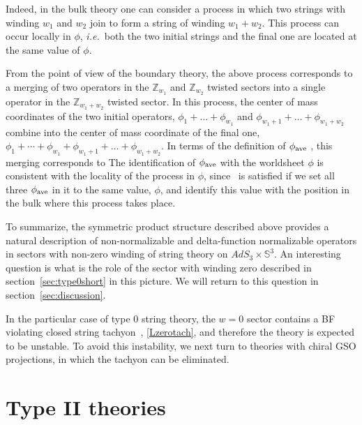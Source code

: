 \documentclass[12pt]{article}
\def\ie{{i.e.}}
\newcommand{\bS}{{\mathbb S}}
\newcommand{\bZ}{{\mathbb Z}}
\numberwithin{equation}{section}
\def\ie{{\it i.e.}}
\def\ie{{\it i.e.}}
\begin{document}
Indeed, in the bulk theory one can consider a process in which two strings with winding $w_1$ and $w_2$ join to form a string of winding $w_1+w_2$. This process can occur locally in $\phi$, \ie\ both the two initial strings and the final one are located at the same value of $\phi$. 

From the point of view of the boundary theory, the above process corresponds to a merging of two operators in the $\bZ_{w_1}$ and $\bZ_{w_2}$ twisted sectors into a single operator in the $\bZ_{w_1+w_2}$ twisted sector. In this process, the center of mass coordinates of the two initial operators, $\phi_1+\dots+\phi_{w_1}$ and $\phi_{w_1+1}+\dots+\phi_{w_1+w_2}$ combine into the center of mass coordinate of the final one, $\phi_1+\cdots+\phi_{w_1}+\phi_{w_1+1}+\dots+\phi_{w_1+w_2}$. In terms of the definition of $\phi_{\rm ave}$ \phiave, this merging corresponds to 
The identification of $\phi_{\rm ave}$ with the worldsheet $\phi$ is consistent with the locality of the process in $\phi$, since \bulklocal\ is satisfied if we set all three $\phi_{\rm ave}$ in it to the same value, $\phi$, and identify this value with the position in the bulk where this process takes place. 

To summarize, the symmetric product structure described above provides a natural description of non-normalizable and delta-function normalizable operators in sectors with non-zero winding of string theory on $AdS_3\times \bS^3$. An interesting question is what is the role of the sector with winding zero described in section~\ref{sec:type0short} in this picture. We will return to this question in section~\ref{sec:discussion}.

In the particular case of type 0 string theory, the $w=0$ sector contains a BF violating closed string tachyon~\VNS, \eqref{Lzerotach}, and therefore the theory is expected to be unstable.  To avoid this instability, we next turn to theories with chiral GSO projections, in which the tachyon can be eliminated. 




\section{Type II theories}
\label{sec:typeIIshort}
\end{document}

